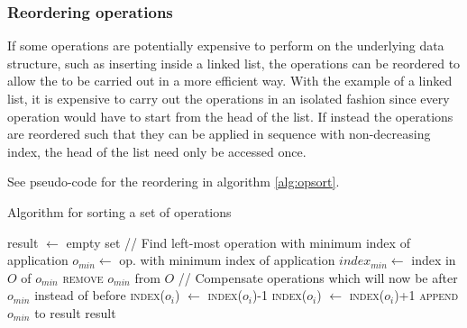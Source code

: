 \subsubsection{Reordering operations}

If some operations are potentially  expensive to perform on the underlying data
structure, such as inserting  inside a linked list, the operations can be
reordered to allow the to be  carried out in a more efficient way. With the
example of a linked list, it is  expensive to carry out the operations in an
isolated fashion since every  operation would have to start from the head of the
list. If instead the  operations are reordered such that they can be applied in
sequence with  non-decreasing index, the head of the list need only be accessed
once.



See pseudo-code for the reordering in algorithm \ref{alg:opsort}.

\begin{algorithm}[!ht]
  \caption{Algorithm for sorting a set of operations}
  \label{alg:opsort}
  \begin{algorithmic}
      \State result $\gets$ empty set
        \State // Find left-most operation with minimum index of application
        \State $o_{min} \gets$ op. with minimum index of application
        \State $index_{min} \gets$ index in $O$ of $o_{min}$
        \State \textsc{remove} $o_{min}$ from $O$
        \Statex
        \State // Compensate operations which will now be after $o_{min}$ instead of before
            \State \textsc{index}($o_i$) $\gets$ \textsc{index}($o_i$)-1
          \EndFor
            \State \textsc{index}($o_i$) $\gets$ \textsc{index}($o_i$)+1
          \EndFor
        \EndIf
        \State \textsc{append} $o_{min}$ to result
      \EndWhile
      \Statex
      \State \Return result
    \EndFunction
  \end{algorithmic}
\end{algorithm}
